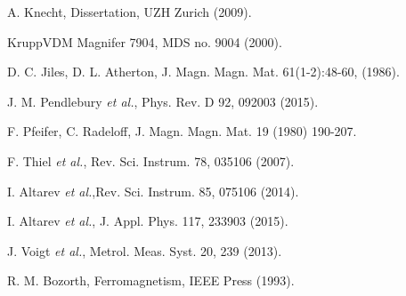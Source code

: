 \documentclass[review]{elsarticle}
\begin{document}
\begin{thebibliography}{00}
 A. Knecht, Dissertation, UZH Zurich (2009).

 KruppVDM Magnifer 7904, MDS no. 9004 (2000).

 D. C. Jiles, D. L. Atherton,  J. Magn. Magn. Mat. 61(1-2):48-60, (1986).

 J. M. Pendlebury {\it et al.}, Phys. Rev. D 92, 092003 (2015).

 F. Pfeifer, C. Radeloff, J. Magn. Magn. Mat. 19 (1980) 190-207.

 F. Thiel {\it et al.}, Rev. Sci. Instrum. 78, 035106 (2007).

 I. Altarev {\it et al.},Rev. Sci. Instrum. 85, 075106 (2014).

 I. Altarev {\it et al.}, J. Appl. Phys. 117, 233903 (2015).

 J. Voigt {\it et al.}, Metrol. Meas. Syst. 20, 239 (2013).

 R. M. Bozorth, Ferromagnetism, IEEE Press (1993).
\end{thebibliography}
\end{document}
